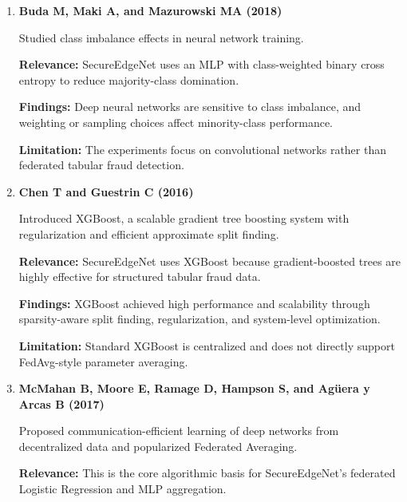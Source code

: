 \begin{enumerate}
    \textbf{Relevance:} SecureEdgeNet reports PR-AUC alongside ROC-AUC because fraud is the minority class.

    \textbf{Findings:} ROC curves can appear optimistic under severe imbalance, while PR curves focus directly on positive-class detection quality.

    \textbf{Limitation:} The paper is metric-focused and does not prescribe a complete fraud model architecture.

    \item \textbf{Buda M, Maki A, and Mazurowski MA (2018) \cite{ref10}}

    Studied class imbalance effects in neural network training.

    \textbf{Relevance:} SecureEdgeNet uses an MLP with class-weighted binary cross entropy to reduce majority-class domination.

    \textbf{Findings:} Deep neural networks are sensitive to class imbalance, and weighting or sampling choices affect minority-class performance.

    \textbf{Limitation:} The experiments focus on convolutional networks rather than federated tabular fraud detection.

    \item \textbf{Chen T and Guestrin C (2016) \cite{ref11}}

    Introduced XGBoost, a scalable gradient tree boosting system with regularization and efficient approximate split finding.

    \textbf{Relevance:} SecureEdgeNet uses XGBoost because gradient-boosted trees are highly effective for structured tabular fraud data.

    \textbf{Findings:} XGBoost achieved high performance and scalability through sparsity-aware split finding, regularization, and system-level optimization.

    \textbf{Limitation:} Standard XGBoost is centralized and does not directly support FedAvg-style parameter averaging.

    \item \textbf{McMahan B, Moore E, Ramage D, Hampson S, and Ag\"uera y Arcas B (2017) \cite{ref12}}

    Proposed communication-efficient learning of deep networks from decentralized data and popularized Federated Averaging.

    \textbf{Relevance:} This is the core algorithmic basis for SecureEdgeNet's federated Logistic Regression and MLP aggregation.


\end{enumerate}
